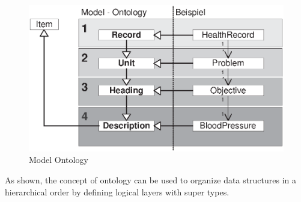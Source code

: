 \begin{figure}[ht]
    \begin{center}
       \includegraphics[scale=0.6]{eps/ModelOntologyUML.eps}
       \caption{Model Ontology}
       \label{model_ontology_figure}
    \end{center}
\end{figure}

As shown, the concept of ontology can be used to organize data structures in
a hierarchical order by defining logical layers with super types.

